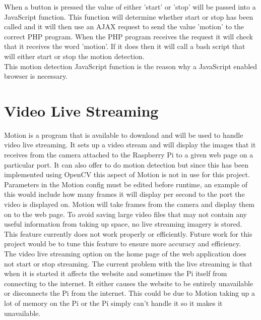 \documentclass[12pt]{report}
\begin{document}
When a button is pressed the value of either 'start' or 'stop' will be passed into a JavaScript function. This function will determine whether start or stop has been called and it will then use an AJAX request to send the value 'motion' to the correct PHP program. When the PHP program receives the request it will check that it receives the word 'motion'. If it does then it will call a bash script that will either start or stop the motion detection.\\

This motion detection JavaScript function is the reason why a JavaScript enabled browser is necessary.\\

\newpage
\section{Video Live Streaming}
\label{sec:video}

Motion is a program that is available to download and will be used to handle video live streaming. It sets up a video stream and will display the images that it receives from the camera attached to the Raspberry Pi to a given web page on a particular port. It can also offer to do motion detection but since this has been implemented using OpenCV this aspect of Motion is not in use for this project.\\


Parameters in the Motion config must be edited before runtime, an example of this would include how many frames it will display per second to the port the video is displayed on. Motion will take frames from the camera and display them on to the web page. To avoid saving large video files that may not contain any useful information from taking up space, no live streaming imagery is stored. This feature currently does not work properly or efficiently. Future work for this project would be to tune this feature to ensure more accuracy and efficiency.\\

The video live streaming option on the home page of the web application does not start or stop streaming. The current problem with the live streaming is that when it is started it affects the website and sometimes the Pi itself from connecting to the internet. It either causes the website to be entirely unavailable or disconnects the Pi from the internet. This could be due to Motion taking up a lot of memory on the Pi or the Pi simply can't handle it so it makes it unavailable. \\
\end{document}
